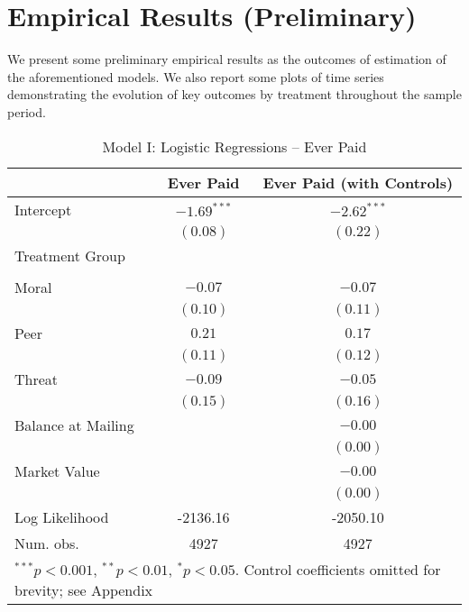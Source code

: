 \documentclass[12pt,titlepage]{article}
\begin{document}
\section{Empirical Results (Preliminary) }

We present some preliminary empirical results as the outcomes of
estimation of the aforementioned models. We also report some plots of time series
demonstrating the evolution of key outcomes by treatment throughout the sample
period.


\begin{table}[htbp]
\begin{center}
\begin{tabular}{l c c }
\hline
                   & Ever Paid & Ever Paid (with Controls) \\
\hline
Intercept          & $-1.69^{***}$ & $-2.62^{***}$ \\
                   & $(0.08)$      & $(0.22)$      \\
Treatment Group    &               &               \\
                   &               &               \\
\quad Moral        & $-0.07$       & $-0.07$       \\
                   & $(0.10)$      & $(0.11)$      \\
\quad Peer         & $0.21$        & $0.17$        \\
                   & $(0.11)$      & $(0.12)$      \\
\quad Threat       & $-0.09$       & $-0.05$       \\
                   & $(0.15)$      & $(0.16)$      \\
Balance at Mailing &               & $-0.00$       \\
                   &               & $(0.00)$      \\
Market Value       &               & $-0.00$       \\
                   &               & $(0.00)$      \\
\hline
Log Likelihood     & -2136.16      & -2050.10      \\
Num. obs.          & 4927          & 4927          \\
\hline
\multicolumn{3}{l}{\scriptsize{$^{***}p<0.001$, $^{**}p<0.01$, $^*p<0.05$. Control coefficients omitted for brevity; see Appendix}}
\end{tabular}
\caption{Model I: Logistic Regressions -- Ever Paid}
\label{table:modelI}
\end{center}
\end{table}
\end{document}
